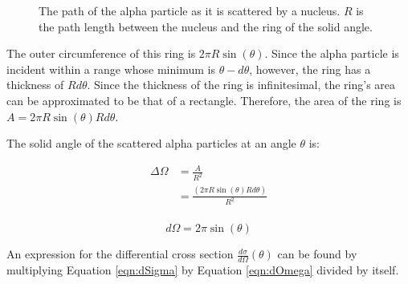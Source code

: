 \documentclass[a4paper]{article}
\begin{document}
\begin{figure}[H]
  \begin{center}
  \end{center}
  \caption{The path of the alpha particle as it is scattered by a nucleus. \( R
    \) is the path length between the nucleus and the ring of the solid
    angle.}
  \label{fig:alphaDist}
\end{figure}

\qq The outer circumference of this ring is \( 2 \pi R \sin{(\theta)} \). Since
the alpha particle is incident within a range whose minimum is \( \theta -
d\theta \), however, the ring has a thickness of \( R d\theta \). Since the
thickness of the ring is infinitesimal, the ring's area can be approximated to
be that of a rectangle. Therefore, the area of the ring is \( A = 2 \pi R
\sin{(\theta)} R d\theta \). 

\qq The solid angle of the scattered alpha particles at an angle \( \theta \)
is:

\begin{align*}
  \Delta \Omega &= \frac{A}{R^2} \\
                &= \frac{(2 \pi R \sin{(\theta)} R d\theta)}{R^2} \\
\end{align*}

\begin{equation}
  d\Omega = 2 \pi \sin{(\theta)} 
\end{equation}
\label{eqn:dOmega}

\qq An expression for the differential cross section \( \frac{d\sigma}{d\Omega}
(\theta) \) can be found by multiplying Equation \ref{eqn:dSigma} by Equation
\ref{eqn:dOmega} divided by itself.
\end{document}
